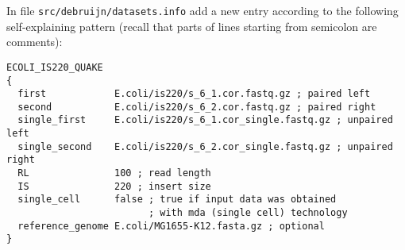 \documentclass{article}
\begin{document}
In file {\tt src/debruijn/datasets.info} add a new entry according to the following self-explaining pattern (recall that parts of lines starting from
semicolon are comments):
\begin{lstlisting}
ECOLI_IS220_QUAKE
{
  first            E.coli/is220/s_6_1.cor.fastq.gz ; paired left
  second           E.coli/is220/s_6_2.cor.fastq.gz ; paired right
  single_first     E.coli/is220/s_6_1.cor_single.fastq.gz ; unpaired left
  single_second    E.coli/is220/s_6_2.cor_single.fastq.gz ; unpaired right
  RL               100 ; read length
  IS               220 ; insert size
  single_cell      false ; true if input data was obtained 
                         ; with mda (single cell) technology
  reference_genome E.coli/MG1655-K12.fasta.gz ; optional
}
\end{lstlisting}



\end{document}
